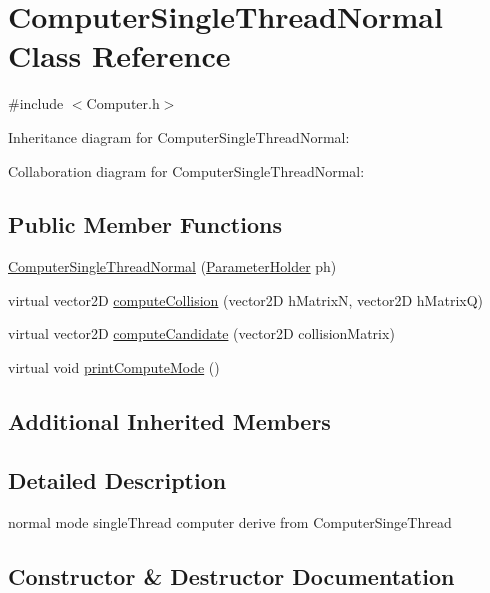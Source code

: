 \hypertarget{classComputerSingleThreadNormal}{}\section{Computer\+Single\+Thread\+Normal Class Reference}
\label{classComputerSingleThreadNormal}


{\ttfamily \#include $<$Computer.\+h$>$}



Inheritance diagram for Computer\+Single\+Thread\+Normal\+:


Collaboration diagram for Computer\+Single\+Thread\+Normal\+:
\subsection*{Public Member Functions}
\begin{DoxyCompactItemize}
\item 
\hyperlink{classComputerSingleThreadNormal_aea1ae678e2e868c57d2da846cd900a7a}{Computer\+Single\+Thread\+Normal} (\hyperlink{structParameterHolder}{Parameter\+Holder} ph)
\item 
virtual vector2D \hyperlink{classComputerSingleThreadNormal_aa7b6f9660bc855217f2179ee122f45e2}{compute\+Collision} (vector2D h\+MatrixN, vector2D h\+MatrixQ)
\item 
virtual vector2D \hyperlink{classComputerSingleThreadNormal_adcfae25fb2af091de5f946aca3130c0e}{compute\+Candidate} (vector2D collision\+Matrix)
\item 
virtual void \hyperlink{classComputerSingleThreadNormal_a0ea9d97627b450d4d9d28f159061ff0b}{print\+Compute\+Mode} ()
\end{DoxyCompactItemize}
\subsection*{Additional Inherited Members}


\subsection{Detailed Description}
normal mode single\+Thread computer derive from Computer\+Singe\+Thread 

\subsection{Constructor \& Destructor Documentation}

